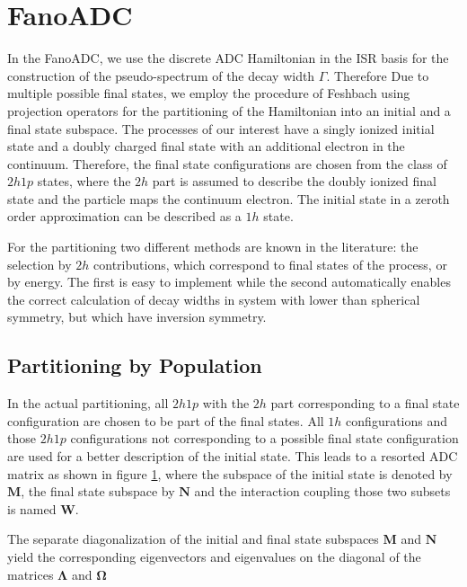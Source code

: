 \section{FanoADC}
In the FanoADC, we use the discrete ADC Hamiltonian in the \ac{ISR}
basis for the construction of the pseudo-spectrum of the decay width
$\Gamma$.
Therefore
Due to multiple possible final states, we employ the procedure
of Feshbach using projection operators for the partitioning of the Hamiltonian
into an initial and a final state subspace.
The processes of our interest have a singly ionized initial state and a
doubly charged final state with an additional electron in the continuum.
Therefore, the final state configurations are chosen from
the class of $2h1p$ states, where the $2h$ part is assumed to
describe the doubly ionized final state and the particle maps the continuum electron.
The initial state in a zeroth order approximation can be described as a $1h$ state.

For the partitioning two different methods are known in the literature:
the selection by $2h$ contributions, which correspond to final states of
the process\cite{Averbukh05}, or by energy\cite{}.
The first is easy to implement while the second automatically
enables the correct calculation of decay widths in system with lower than
spherical symmetry, but which have inversion symmetry.


\subsection{Partitioning by Population}
In the actual partitioning, all $2h1p$ with the $2h$ part corresponding to
a final state configuration are chosen to be part of the final states.
All $1h$ configurations and those $2h1p$ configurations not corresponding
to a possible final state configuration are used for a better description
of the initial state. This leads to a resorted \ac{ADC} matrix as shown in
figure \ref{figure:fano_matsort}, where the subspace of the initial state
is denoted by $\mathbf{M}$, the final state subspace by $\mathbf{N}$ and
the interaction coupling those two subsets is named $\mathbf{W}$.

\begin{figure}[h]
  \centering
  
  \caption{}
  \label{figure:fano_matsort}
\end{figure}

The separate diagonalization of the initial and final state subspaces
$\mathbf{M}$ and $\mathbf{N}$ yield
the corresponding eigenvectors and eigenvalues on the diagonal of the
matrices $\mathbf{\Lambda}$ and $\mathbf{\Omega}$

